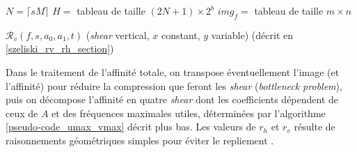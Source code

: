    \begin{algorithme}
    $N = \lceil sM \rceil$\;
    $H = $ tableau de taille $(2N+1) \times 2^b$\;
    $img_f = $ tableau de taille $m \times n$\;
    \caption{$\mathcal{R}_v(f,s,a_0,a_1,t)$ (\textit{shear} vertical, $x$ constant, $y$ variable) (décrit en \ref{szeliski_rv_rh_section})}
    \label{szeliski_rv}
   \end{algorithme}










  Dans le traitement de l'affinité totale, on transpose éventuellement l'image (et l'affinité) pour réduire la compression que feront les \textit{shear} (\emph{bottleneck problem}), puis on décompose l'affinité en quatre \textit{shear} dont les coefficients dépendent de ceux de $A$ et des fréquences maximales utiles, déterminées par l'algorithme \ref{pseudo-code_umax_vmax} décrit plus bas. Les valeurs de $r_h$ et $r_v$ résulte de raisonnements géométriques simples pour éviter le repliement \cite{szeliski2010high}.
  
